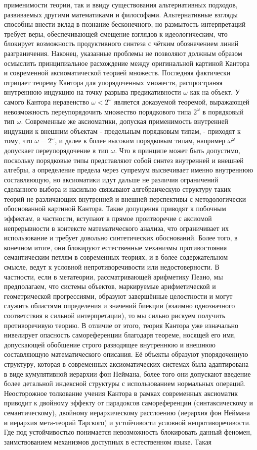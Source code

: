 \documentclass[12pt]{article}
\begin{document}
применимости теории, так и ввиду существования альтернативных подходов, развиваемых другими математиками и философами. Альтернативные взгляды способны внести вклад в познание бесконечного, но размытость интерпретаций требует веры, обеспечивающей смещение взглядов к идеологическим, что блокирует возможность продуктивного синтеза с чётким обозначением линий разграничения. Наконец, указанные проблемы не позволяют должным образом осмыслить принципиальное расхождение между оригинальной картиной Кантора и современной аксиоматической теорией множеств. Последняя фактически отрицает теорему Кантора для упорядоченных множеств, распространяя внутреннюю индукцию на точку разрыва предикативности $\omega$ как на объект. У самого Кантора неравенство $\omega < 2^\omega$ является доказуемой теоремой, выражающей невозможность переупорядочить множество порядкового типа $2^\omega$ в порядковый тип $\omega$. Современные же аксиоматики, допуская применимость внутренней индукции к внешним объектам - предельным порядковым типам, - приходят к тому, что $\omega = 2^\omega$, и далее к более высоким порядковым типам, например $\omega^\omega$ допускает переупорядочение в тип $\omega$. Что в принципе может быть допустимо, поскольку порядковые типы представляют собой синтез внутренней и внешней алгебры, а определение предела через супремум высвечивает именно внутреннюю составляющую, но аксиоматики идут дальше не различия ограничений сделанного выбора и насильно связывают алгебраическую структуру таких теорий не различающих внутренней и внешней перспективы с методологически обоснованной картиной Кантора. Такие допущения приводят к побочным эффектам, в частности, вступают в прямое проитворечие с аксиомой непрерывности в контексте математического анализа, что ограничивает их использование и требует довольно синтетических обоснований. Более того, в конечном итоге, они блокируют естественные механизмы противостояния семантическим петлям в современных теориях, и в более содержательном смысле, ведут к условной непротиворечивости или недостоверности. В частности, если в метатеории, рассматривающей арифметику Пеано, мы предполагаем, что системы объектов, маркируемые арифметической и геометрической прогрессиями, образуют завершённые целостности и могут служить областями определения и значений биекции (взаимно однозначного соответствия в сильной интерпретации), то мы сильно рискуем получить противоречивую теорию. В отличие от этого, теория Кантора уже изначально нивелирует опасность самореференции благодаря теореме, носящей его имя, допускающей обобщение строго разводящее внутреннюю и внешнюю составляющую математического описания. Её объекты образуют упорядоченную структуру, которая в современных аксиоматических системах была адаптирована в виде кумулятивной иерархии фон Неймана, более того они допускают введение более детальной индексной структуры с использованием нормальных операций. Неосторожное толкование учения Кантора в рамках современных аксиоматик приводит к двойному эффекту от парадоксов самореференции (синтаксическому и семантическому), двойному иерархическому расслоению (иерархия фон Неймана и иерархия мета-теорий Тарского) и устойчивости условной непротиворечивости. Где под устойчивостью понимается невозможность блокировать данный феномен, заимствованием механизмов доступных в естественном языке. Такая 
\end{document}
